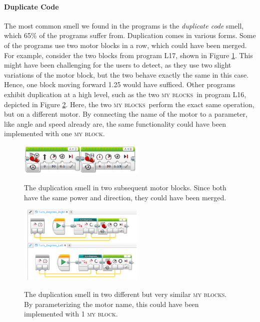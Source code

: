 \documentclass[conference]{IEEEtran}
\newcommand{\mbs}{\textsc{my blocks}}
\newcommand{\mb}{\textsc{my block}}
\begin{document}
\paragraph{Duplicate Code}
The most common smell we found in the programs is the \emph{duplicate code} smell, which 65\% of the programs suffer from. Duplication comes in various forms.  Some of the programs use two motor blocks in a row, which could have been merged. For example, consider the two blocks from program L17, shown in Figure \ref{fig:dup_ev3}. This might have been challenging for the users to detect, as they use two slight variations of the motor block, but the two behave exactly the same in this case. Hence, one block moving forward 1.25 would have sufficed. Other programs exhibit duplication at a high level, such as the two \mbs~in program L16, depicted in Figure \ref{fig:dup_ev3_myblocks}. Here, the two \mbs~perform the exact same operation, but on a different motor. By connecting the name of the motor to a parameter, like angle and speed already are, the same functionality could have been implemented with one \mb.

\begin{figure} [tb]
\caption{The duplication smell in two subsequent motor blocks. Since both have the same power and direction, they could have been merged. }
\centering
\includegraphics[width=6cm]{img/dup_ev3}
\label{fig:dup_ev3}
\end{figure}

\begin{figure} [tb]
\caption{The duplication smell in two different but very similar \mbs. By parameterizing the motor name, this could have been implemented with 1 \mb. }
\centering
\includegraphics[width=6cm]{img/dup_ev3_myblocks}
\label{fig:dup_ev3_myblocks}
\end{figure}
\end{document}
